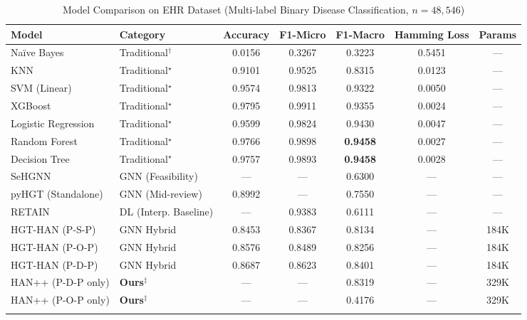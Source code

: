 \documentclass[conference]{IEEEtran}
\begin{document}
\begin{table}[t]
  \caption{Model Comparison on EHR Dataset
           (Multi-label Binary Disease Classification, $n = 48{,}546$)}
  \label{tab:main_results}
  \centering
  \begin{tabular}{llccccc}
    \toprule
    \textbf{Model} & \textbf{Category} &
    \textbf{Accuracy} & \textbf{F1-Micro} & \textbf{F1-Macro} &
    \textbf{Hamming Loss} & \textbf{Params} \\
    \midrule
    Naïve Bayes              & Traditional$^\dagger$ & 0.0156 & 0.3267 & 0.3223 & 0.5451 & --- \\
    KNN                      & Traditional$^\star$   & 0.9101 & 0.9525 & 0.8315 & 0.0123 & --- \\
    SVM (Linear)             & Traditional$^\star$   & 0.9574 & 0.9813 & 0.9322 & 0.0050 & --- \\
    XGBoost                  & Traditional$^\star$   & 0.9795 & 0.9911 & 0.9355 & 0.0024 & --- \\
    Logistic Regression      & Traditional$^\star$   & 0.9599 & 0.9824 & 0.9430 & 0.0047 & --- \\
    Random Forest            & Traditional$^\star$   & 0.9766 & 0.9898 & \textbf{0.9458} & 0.0027 & --- \\
    Decision Tree            & Traditional$^\star$   & 0.9757 & 0.9893 & \textbf{0.9458} & 0.0028 & --- \\
    \midrule
    SeHGNN \cite{yang_2023}  & GNN (Feasibility)& ---   & ---   & 0.6300 & ---    & --- \\
    pyHGT (Standalone)       & GNN (Mid-review) & 0.8992 & ---  & 0.7550 & ---    & --- \\
    RETAIN \cite{choi_2016_retain} & DL (Interp. Baseline) & --- & 0.9383 & 0.6111 & --- & --- \\
    \midrule
    HGT-HAN (P-S-P)          & GNN Hybrid       & 0.8453 & 0.8367 & 0.8134 & --- & 184K \\
    HGT-HAN (P-O-P)          & GNN Hybrid       & 0.8576 & 0.8489 & 0.8256 & --- & 184K \\
    HGT-HAN (P-D-P)          & GNN Hybrid       & 0.8687 & 0.8623 & 0.8401 & --- & 184K \\
    \midrule
    HAN++ (P-D-P only)       & \textbf{Ours}$^\ddagger$  & --- & --- & 0.8319 & --- & 329K \\
    HAN++ (P-O-P only)       & \textbf{Ours}$^\ddagger$  & --- & --- & 0.4176 & --- & 329K \\
    \rowcolor{yellow!20}

\end{tabular}
\end{table}
\end{document}
